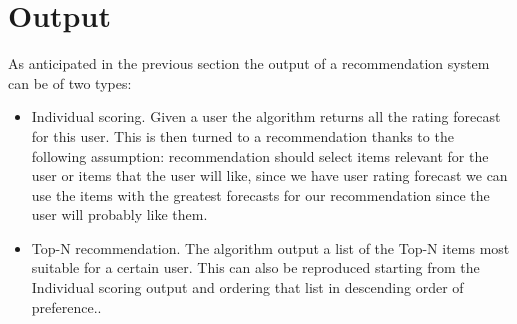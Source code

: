 \section{Output}
\label{sec:Output}

As anticipated in the previous section the output of a recommendation system can be of two types:
\begin{itemize}
\item Individual scoring. Given a user the algorithm returns all the rating forecast for this user. This is then turned to a recommendation thanks to the following assumption: recommendation should select items relevant for the user or items that the user will like, since we have user rating forecast we can use the items with the greatest forecasts for our recommendation since the user will probably like them. 
\item Top-N recommendation. The algorithm output a list of the Top-N items most suitable for a certain user. This can also be reproduced starting from the Individual scoring output and ordering that list in descending order of preference..
\end{itemize}